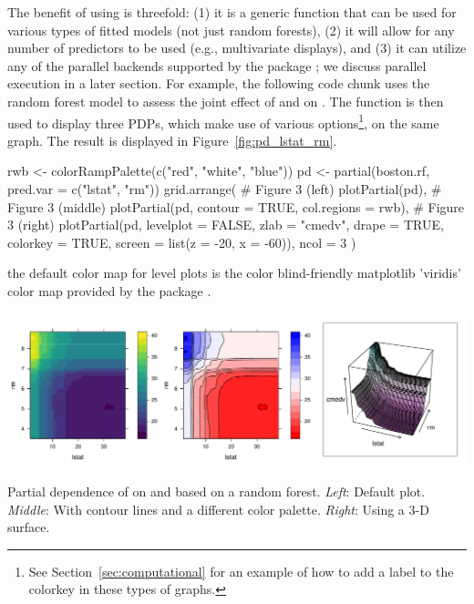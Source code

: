 The benefit of using  is threefold: (1) it is a generic function that can be used for various types of fitted models (not just random forests), (2) it will allow for any number of predictors to be used (e.g., multivariate displays), and (3) it can utilize any of the parallel backends supported by the  package \citep{foreach-pkg}; we discuss parallel execution in a later section. For example, the following code chunk uses the random forest model to assess the joint effect of  and  on . The  function is then used to display three PDPs, which make use of various  options\footnote{See Section~\ref{sec:computational} for an example of how to add a label to the colorkey in these types of graphs.}, on the same graph. The result is displayed in Figure~\ref{fig:pd_lstat_rm}.
\begin{example}
rwb <- colorRampPalette(c("red", "white", "blue"))
pd <- partial(boston.rf, pred.var = c("lstat", "rm"))
grid.arrange(
  # Figure 3 (left)
  plotPartial(pd),
  # Figure 3 (middle)
  plotPartial(pd, contour = TRUE, col.regions = rwb),
  # Figure 3 (right)
  plotPartial(pd, levelplot = FALSE, zlab = "cmedv", drape = TRUE,
              colorkey = TRUE, screen = list(z = -20, x = -60)),
  ncol = 3
)
\end{example}
 the default color map for level plots is the color blind-friendly matplotlib \citep{hunter-matplotlib-2007} 'viridis' color map provided by the  package \citep{viridis-pkg}.

\begin{widefigure}[htbp]
  \centering
  \includegraphics[width=1.0\linewidth]{pd_lstat_rm}
  \caption{Partial dependence of  on  and  based on a random forest. \textit{Left}: Default plot. \textit{Middle}: With contour lines and a different color palette. \textit{Right}: Using a 3-D surface.}
  \label{fig:pd_lstat_rm}
\end{widefigure}


